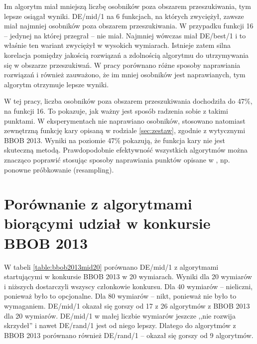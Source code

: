 \documentclass[a4paper,onecolumn,oneside,12pt,wide,floatssmall]{mwrep}
\theoremstyle{definition}
\theoremstyle{plain}%
\theoremstyle{remark}
\begin{document}
Im algorytm miał mniejszą liczbę osobników poza obszarem przeszukiwania, tym lepsze osiągał wyniki.
DE/mid/1 na 6 funkcjach, na których zwyciężył, zawsze miał najmniej osobników poza obszarem
przeszukiwania. W przypadku funkcji 16 -- jedynej na której przegrał -- nie miał. Najmniej
wówczas miał DE/best/1 i to właśnie ten wariant zwyciężył w wysokich wymiarach. Istnieje zatem silna korelacja
pomiędzy jakością rozwiązań a zdolnością algorytmu do utrzymywania się w obszarze przeszukiwań.
W pracy \cite{boundary} porównano różne sposoby naprawiania rozwiązań i również zauważono, że im mniej
osobników jest naprawianych, tym algorytm otrzymuje lepsze wyniki.

W tej pracy, liczba osobników poza obszarem przeszukiwania dochodziła do 47\%, na funkcji 16. To pokazuje,
jak ważny jest sposób radzenia sobie z takimi punktami. W eksperymentach nie 
naprawiano osobników, stosowano natomiast zewnętrzną funkcję kary opisaną w rodziale \ref{sec:zestaw},
zgodnie z wytycznymi BBOB 2013. Wyniki na poziomie 47\% pokazują, że funkcja kary nie jest 
skuteczną metodą. Prawdopodobnie efektywność wszystkich algorytmów można znacząco poprawić 
stosując sposoby naprawiania punktów opisane w \cite{boundary}, np. ponowne próbkowanie (resampling).

\section{Porównanie z algorytmami biorącymi udział w konkursie BBOB 2013}

W tabeli \ref{table:bbob2013mid20} porównano DE/mid/1 z algorytmami startującymi w konkursie BBOB 2013
w 20 wymiarach.
Wyniki dla 20 wymiarów i niższych dostarczyli wszyscy członkowie konkursu. 
Dla 40 wymiarów -- nieliczni, ponieważ było to opcjonalne.
Dla 80 wymiarów -- nikt, ponieważ nie było to wymaganiem.
DE/mid/1 okazał się gorszy od 17 z 26 algorytmów z BBOB 2013 dla 20 wymiarów. DE/mid/1 w małej liczbie wymiarów
jeszcze ,,nie rozwija skrzydeł'' i nawet DE/rand/1 jest od niego lepszy. Dlatego do algorytmów z BBOB 2013 porównano również
DE/rand/1 -- okazał się gorszy od 9 algorytmów.
\end{document}
